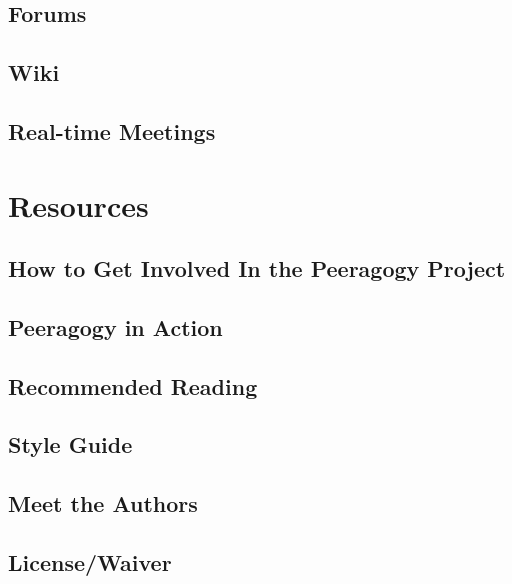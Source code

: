\documentclass[ebook, 12pt, twoside]{memoir}
\begin{document}
\chapter[\textbf{Forums}]{ Forums } 
%

%
\chapter[\textbf{Wiki}]{ Wiki } 
%

%
\chapter[\textbf{Real-time Meetings}]{ Real-time Meetings } 
%



\part{Resources} %
%
\chapter[\textbf{How to get involved}]{ How to Get Involved In the Peeragogy Project } 
%

%
\chapter[\textbf{Peeragogy in Action}]{Peeragogy in Action}
%

%
\chapter[\textbf{Recommended Reading}]{Recommended Reading}
%

%
\chapter[\textbf{Style Guide}]{Style Guide}
%

%
\chapter[\textbf{Meet the Authors}]{Meet the Authors}
%

%
%

\cleardoublepage
\renewcommand{\indexname}{Web Pages Cited in This Book}
\onecolindex
\printindex

\newpage
\chapter[\textbf{License/Waiver}]{License/Waiver}

%
\end{document}
